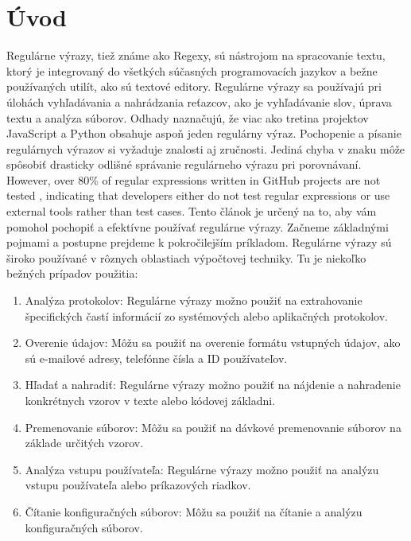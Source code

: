 \documentclass[10pt,twoside,slovak,a4paper]{article}
\begin{document}
\section{Úvod}
Regulárne výrazy, tiež známe ako Regexy, sú nástrojom na spracovanie textu, ktorý je integrovaný do všetkých súčasných programovacích jazykov a bežne používaných utilít, ako sú textové editory. Regulárne výrazy sa používajú pri úlohách vyhľadávania a nahrádzania reťazcov, ako je vyhľadávanie slov, úprava textu a analýza súborov. \cite{Chapman2017}
Odhady naznačujú, že viac ako tretina projektov JavaScript a Python obsahuje aspoň jeden regulárny výraz. \cite{Michael2019}
Pochopenie a písanie regulárnych výrazov si vyžaduje znalosti aj zručnosti. \cite{Chapman2016}
Jediná chyba v znaku môže spôsobiť drasticky odlišné správanie regulárneho výrazu pri porovnávaní. \cite{Wang2019}
However, over 80\% of regular expressions written in GitHub projects are not tested \cite{Wang2018}, indicating that developers either do not test regular expressions or use external tools rather than test cases. \cite{Wang2019} Tento článok je určený na to, aby vám pomohol pochopiť a efektívne používať regulárne výrazy.  Začneme základnými pojmami a postupne prejdeme k pokročilejším príkladom.
Regulárne výrazy sú široko používané v rôznych oblastiach výpočtovej techniky. Tu je niekoľko bežných prípadov použitia:
\begin{enumerate}
	\item Analýza protokolov: Regulárne výrazy možno použiť na extrahovanie špecifických častí informácií zo systémových alebo aplikačných protokolov.
	\item Overenie údajov: Môžu sa použiť na overenie formátu vstupných údajov, ako sú e-mailové adresy, telefónne čísla a ID používateľov.
	\item Hľadať a nahradiť: Regulárne výrazy možno použiť na nájdenie a nahradenie konkrétnych vzorov v texte alebo kódovej základni.
	\item Premenovanie súborov: Môžu sa použiť na dávkové premenovanie súborov na základe určitých vzorov.
	\item Analýza vstupu používateľa: Regulárne výrazy možno použiť na analýzu vstupu používateľa alebo príkazových riadkov.
	\item Čítanie konfiguračných súborov: Môžu sa použiť na čítanie a analýzu konfiguračných súborov.
\end{enumerate}
\end{document}
